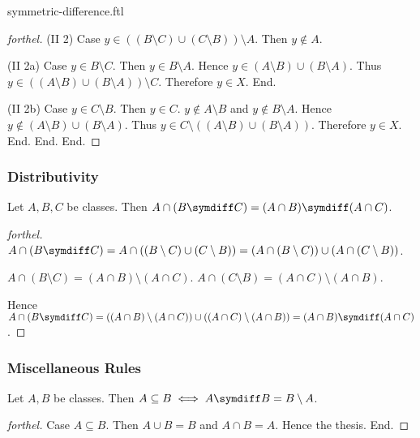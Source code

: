 \documentclass{naproche-library}
\begin{document}
\begin{smodule}{symmetric-difference.ftl}
\begin{proof}[forthel]
      (II 2) Case $y \in ((B \setminus C) \cup (C \setminus B)) \setminus A$.
        Then $y \notin A$.

        (II 2a) Case $y \in B \setminus C$.
          Then $y \in B \setminus A$.
          Hence $y \in (A \setminus B) \cup (B \setminus A)$.
          Thus $y \in ((A \setminus B) \cup (B \setminus A)) \setminus C$.
          Therefore $y \in X$.
        End.

        (II 2b) Case $y \in C \setminus B$.
          Then $y \in C$.
          $y \notin A \setminus B$ and $y \notin B \setminus A$.
          Hence $y \notin (A \setminus B) \cup (B \setminus A)$.
          Thus $y \in C \setminus ((A \setminus B) \cup (B \setminus A))$.
          Therefore $y \in X$.
        End.
      End.
    End.
  \end{proof}


  \subsubsection*{Distributivity}

  \begin{proposition}[forthel,id=FOUNDATIONS_03_4119141910839296,printid]
    Let $A, B, C$ be classes.
    Then $A \cap (B \symdiff C) = (A \cap B) \symdiff (A \cap C)$.
  \end{proposition}
  \begin{proof}[forthel]
    $A \cap (B \symdiff C)
      = A \cap ((B \setminus C) \cup (C \setminus B))
      = (A \cap (B \setminus C)) \cup (A \cap (C \setminus B))$.

    $A \cap (B \setminus C) = (A \cap B) \setminus (A \cap C)$.
    $A \cap (C \setminus B) = (A \cap C) \setminus (A \cap B)$.

    Hence $A \cap (B \symdiff C)
      = ((A \cap B) \setminus (A \cap C)) \cup ((A \cap C) \setminus (A \cap B))
      = (A \cap B) \symdiff (A \cap C)$.
  \end{proof}


  \subsubsection*{Miscellaneous Rules}

  \begin{proposition}[forthel,id=FOUNDATIONS_03_7383417205293056,printid]
    Let $A, B$ be classes.
    Then $A \subseteq B \iff A \symdiff B = B \setminus A$.
  \end{proposition}
  \begin{proof}[forthel]
    Case $A \subseteq B$.
      Then $A \cup B = B$ and $A \cap B = A$.
      Hence the thesis.
    End.


\end{proof}
\end{smodule}
\end{document}
